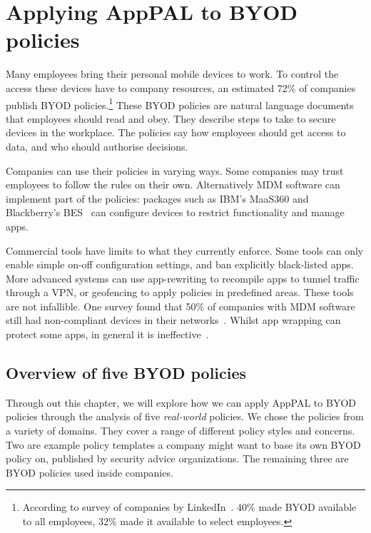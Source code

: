 \documentclass[thesis.tex]{subfiles}
\begin{document}
\chapter{Applying AppPAL to BYOD policies}
\label{chap:byod}

Many employees bring their personal mobile devices to work. To control
the access these devices have to company resources, an estimated 72\%
of companies publish \ac{BYOD} policies.\footnote{According to survey
  of companies by LinkedIn~\cite{schulze_byod_2016}. 40\% made \ac{BYOD}
  available to all employees, 32\% made it available to select
  employees.} These \ac{BYOD} policies are natural language documents
that employees should read and obey. They describe steps to take to
secure devices in the workplace. The policies say how employees should
get access to data, and who should authorise decisions.

Companies can use their policies in varying ways. Some companies may
trust employees to follow the rules on their own. Alternatively
\ac{MDM} software can implement part of the policies: packages such as
IBM's MaaS360 and Blackberry's BES~\cite{ibm_ibm_nodate,blackberry_secure_nodate} can
configure devices to restrict functionality and manage apps.

Commercial tools have limits to what they currently enforce. Some
tools can only enable simple on-off configuration settings, and ban
explicitly black-listed apps. More advanced systems can use
app-rewriting to recompile apps to tunnel traffic through a VPN, or
geofencing to apply policies in predefined areas. These tools are not
infallible. One survey found that 50\% of companies with \ac{MDM}
software still had non-compliant devices in their
networks~\cite{mobileiron_security_labs_q4_2015}. Whilst app wrapping
can protect some apps, in general it is
ineffective~\cite{hao_effectiveness_2013}.

\section{Overview of five BYOD policies}
\label{sec:overview-of-five-byod-policies}

Through out this chapter, we will explore how we can apply AppPAL to
BYOD policies through the analysis of five \emph{real-world} policies.
We chose the policies from a variety of domains.  They cover a range
of different policy styles and concerns.  Two are example policy
templates a company might want to base its own BYOD policy on,
published by security advice organizations.  The remaining three are
BYOD policies used inside companies.
\end{document}
